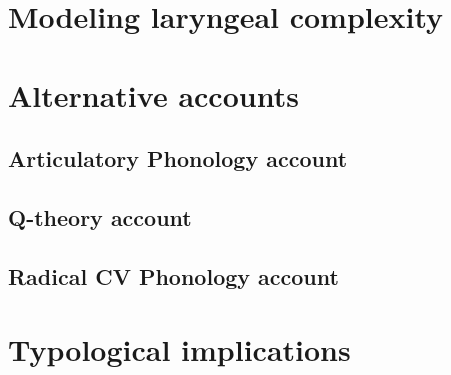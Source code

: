 \section{Modeling laryngeal complexity}\label{sec:modeling_lc}

\section{Alternative accounts}\label{sec:alternative_accounts}

\subsection{Articulatory Phonology account}\label{sec:ap_account}

\subsection{Q-theory account}\label{sec:q_theory_account}

\subsection{Radical CV Phonology account}\label{sec:rcv_account}

\section{Typological implications}\label{sec:typological_implications}

